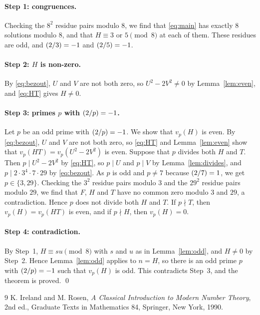 \documentclass[11pt]{article}
\newcommand{\leg}[2]{\mathchoice{\biggl(\dfrac{#1}{#2}\biggr)}{(#1/#2)}{(#1/#2)}{(#1/#2)}}
\begin{document}
\paragraph{Step 1: congruences.} Checking the $8^2$ residue pairs modulo $8$, we find that \eqref{eq:main} has exactly 8 solutions modulo $8$, and that $H\equiv3\text{ or }5\pmod{8}$ at each of them. These residues are odd, and $\leg{2}{3}=-1$ and $\leg{2}{5}=-1$.

\paragraph{Step 2: $H$ is non-zero.} By \eqref{eq:bezout}, $U$ and $V$ are not both zero, so $U^2-2V^2\neq0$ by Lemma~\ref{lem:even}, and \eqref{eq:HT} gives $H\neq0$.

\paragraph{\texorpdfstring{Step 3: primes $p$ with $\leg{2}{p}=-1$.}{Step 3: inert primes.}} Let $p$ be an odd prime with $\leg{2}{p}=-1$. We show that $v_p(H)$ is even. By \eqref{eq:bezout}, $U$ and $V$ are not both zero, so \eqref{eq:HT} and Lemma~\ref{lem:even} show that $v_p(HT)=v_p(U^2-2V^2)$ is even. Suppose that $p$ divides both $H$ and $T$. Then $p\mid U^2-2V^2$ by \eqref{eq:HT}, so $p\mid U$ and $p\mid V$ by Lemma~\ref{lem:divides}, and $p\mid 2\cdot 3^{4}\cdot 7\cdot 29$ by \eqref{eq:bezout}. As $p$ is odd and $p\neq7$ because $\leg{2}{7}=1$, we get $p\in\{3,29\}$. Checking the $3^2$ residue pairs modulo $3$ and the $29^2$ residue pairs modulo $29$, we find that $F$, $H$ and $T$ have no common zero modulo $3$ and $29$, a contradiction. Hence $p$ does not divide both $H$ and $T$. If $p\nmid T$, then $v_p(H)=v_p(HT)$ is even, and if $p\nmid H$, then $v_p(H)=0$.

\paragraph{Step 4: contradiction.} By Step~1, $H\equiv su\pmod{8}$ with $s$ and $u$ as in Lemma~\ref{lem:odd}, and $H\neq0$ by Step~2. Hence Lemma~\ref{lem:odd} applies to $n=H$, so there is an odd prime $p$ with $\leg{2}{p}=-1$ such that $v_p(H)$ is odd. This contradicts Step~3, and the theorem is proved.
\qed

\begin{thebibliography}{9}
 K. Ireland and M. Rosen, \emph{A Classical Introduction to Modern Number Theory}, 2nd ed., Graduate Texts in Mathematics 84, Springer, New York, 1990.
\end{thebibliography}
\end{document}

